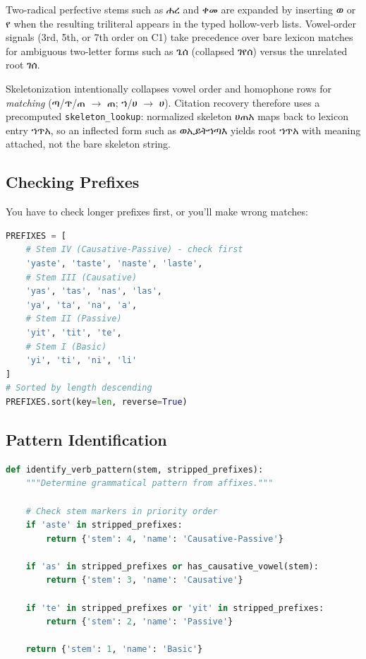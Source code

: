 \documentclass[conference]{IEEEtran}
\newcommand{\geez}[1]{{\ethiopicfont #1}}
\begin{document}
\noindent Two-radical perfective stems such as \geez{ሐረ} and \geez{ቀመ} are expanded by inserting \geez{ወ} or \geez{የ} when the resulting triliteral appears in the typed hollow-verb lists. Vowel-order signals (3rd, 5th, or 7th order on C1) take precedence over bare lexicon matches for ambiguous two-letter forms such as \geez{ጌሰ} (collapsed \geez{ገየሰ}) versus the unrelated root \geez{ገሰ}.

Skeletonization intentionally collapses vowel order and homophone rows for \emph{matching} (\geez{ጣ}/\geez{ጥ}/\geez{ጠ} $\rightarrow$ \geez{ጠ}; \geez{ኀ}/\geez{ሀ} $\rightarrow$ \geez{ሀ}). Citation recovery therefore uses a precomputed \texttt{skeleton\_lookup}: normalized skeleton \geez{ሀጠአ} maps back to lexicon entry \geez{ኀጥአ}, so an inflected form such as \geez{ወኢይትኀጣእ} yields root \geez{ኀጥአ} with meaning attached, not the bare skeleton string.

\subsection{Checking Prefixes}

You have to check longer prefixes first, or you'll make wrong matches:

\begin{lstlisting}[language=Python]
PREFIXES = [
    # Stem IV (Causative-Passive) - check first
    'yaste', 'taste', 'naste', 'laste',
    # Stem III (Causative)
    'yas', 'tas', 'nas', 'las',
    'ya', 'ta', 'na', 'a',
    # Stem II (Passive)
    'yit', 'tit', 'te',
    # Stem I (Basic)
    'yi', 'ti', 'ni', 'li'
]
# Sorted by length descending
PREFIXES.sort(key=len, reverse=True)
\end{lstlisting}

\subsection{Pattern Identification}

\begin{lstlisting}[language=Python]
def identify_verb_pattern(stem, stripped_prefixes):
    """Determine grammatical pattern from affixes."""
    
    # Check stem markers in priority order
    if 'aste' in stripped_prefixes:
        return {'stem': 4, 'name': 'Causative-Passive'}
    
    if 'as' in stripped_prefixes or has_causative_vowel(stem):
        return {'stem': 3, 'name': 'Causative'}
    
    if 'te' in stripped_prefixes or 'yit' in stripped_prefixes:
        return {'stem': 2, 'name': 'Passive'}
    
    return {'stem': 1, 'name': 'Basic'}
\end{lstlisting}
\end{document}
